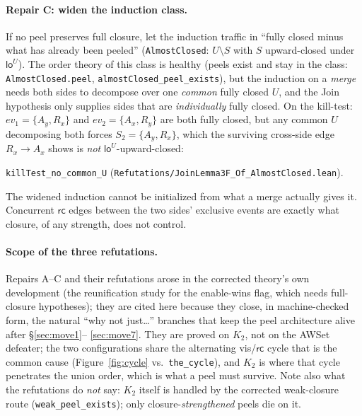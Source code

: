 \documentclass[11pt]{article}
\newcommand{\rcrel}{\mathsf{rc}}
\newcommand{\loE}[1]{\mathsf{lo}^{#1}}
\newcommand{\lean}[1]{\texttt{#1}}
\begin{document}
\paragraph{Repair C: widen the induction class.} If no peel preserves
full closure, let the induction traffic in ``fully closed minus what
has already been peeled'' (\lean{AlmostClosed}: $U \setminus S$ with
$S$ upward-closed under $\loE{U}$). The order theory of this class is
healthy (peels exist and stay in the class:
\lean{AlmostClosed.peel}, \lean{almostClosed\_peel\_exists}), but the
induction on a \emph{merge} needs both sides to decompose over one
\emph{common} fully closed $U$, and the Join hypothesis only supplies
sides that are \emph{individually} fully closed. On the kill-test:
$\mathit{ev}_1 = \{A_y, R_x\}$ and $\mathit{ev}_2 = \{A_x, R_y\}$ are
both fully closed, but any common $U$ decomposing both forces
$S_2 = \{A_y, R_x\}$, which the surviving cross-side edge
$R_x \to A_x$ shows is \emph{not} $\loE{U}$-upward-closed:
\begin{center}
\lean{killTest\_no\_common\_U}
(\lean{Refutations/JoinLemma3F\_Of\_AlmostClosed.lean}).
\end{center}
The widened induction cannot be initialized from what a merge
actually gives it. Concurrent $\rcrel$ edges between the two sides'
exclusive events are exactly what closure, of any strength, does not
control.

\paragraph{Scope of the three refutations.} Repairs A--C and their
refutations arose in the corrected theory's own development (the
reunification study for the enable-wins flag, which needs full-closure
hypotheses); they are cited here because they close, in
machine-checked form, the natural ``why not just\ldots'' branches that
keep the peel architecture alive after \S\ref{sec:move1}--%
\ref{sec:move7}. They are proved on $K_2$, not on the AWSet defeater;
the two configurations share the alternating vis/$\rcrel$ cycle that
is the common cause (Figure~\ref{fig:cycle} vs.\ \lean{the\_cycle}),
and $K_2$ is where that cycle penetrates the union order, which is
what a peel must survive. Note also what the refutations do
\emph{not} say: $K_2$ itself is handled by the corrected weak-closure
route (\lean{weak\_peel\_exists}); only closure-\emph{strengthened}
peels die on it.
\end{document}

